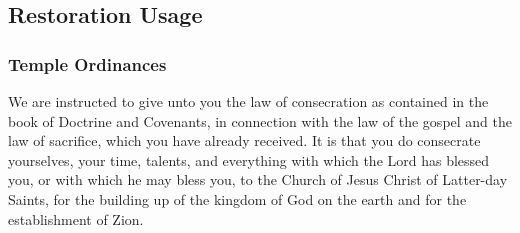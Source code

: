 
\subsection{Restoration Usage} %
	\label{CONSECRATION-RESTORATION}

	
		
	\subsubsection{Temple Ordinances}
		\label{CONSECRATION-TEMPLE}
	
		\begin{compactdesc}
			\item[{\hyperref[TEMPLE-ENDOWMENT-ENDOW-PRE-1990-CONSECRATION]{Law of consecration}}] We are instructed to give unto you the law of consecration as contained in the book of Doctrine and Covenants, in connection with the law of the gospel and the law of sacrifice, which you have already received. It is that you do consecrate yourselves, your time, talents, and everything with which the Lord has blessed you, or with which he may bless you, to the Church of Jesus Christ of Latter-day Saints, for the building up of the kingdom of God on the earth and for the establishment of Zion.
		\end{compactdesc}
	
	
	
